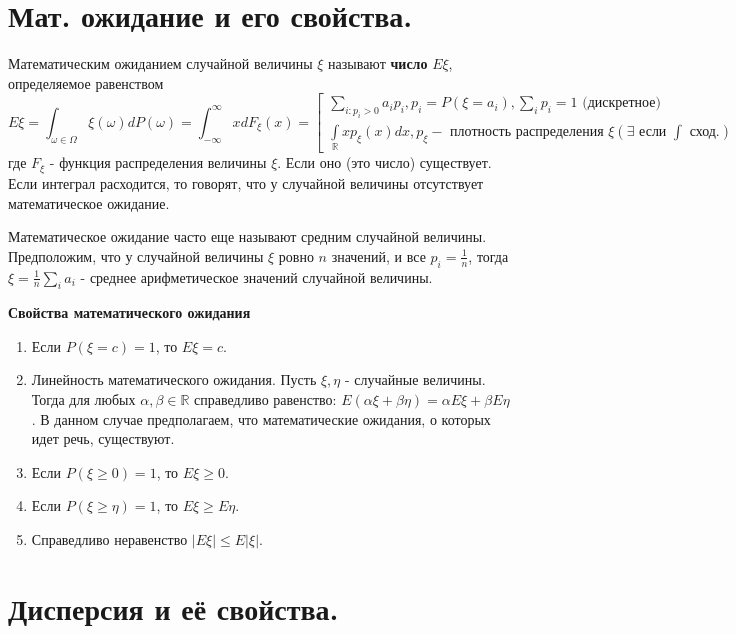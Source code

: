 \section{Мат. ожидание и его свойства.}

Математическим ожиданием случайной величины $\xi$ называют \textbf{число} $E\xi$, определяемое равенством
\[ E\xi = \int_{\omega \in \Omega} \xi (\omega) d P(\omega) = \int_{-\infty}^{\infty} x dF_{\xi} (x) = 
\left[
\begin{array}{c}
	\sum\limits_{i: p_i > 0} a_i p_i, p_i = P(\xi = a_i), \sum_{i} p_i = 1 \text{ (дискретное)} \\
	\int\limits_{\mathbb{R}} x p_{\xi} (x) dx, p_{\xi} - \text{ плотность распределения } \xi (\exists \text{ если } \int \text{ сход.})
\end{array}
\right.
\]
где $F_{\xi}$ - функция распределения величины $\xi$.
Если оно (это число) существует. Если интеграл расходится, то говорят, что у случайной величины отсутствует математическое ожидание.

\begin{remark}
	Математическое ожидание часто еще называют средним случайной величины. Предположим, что у случайной величины $\xi$ ровно $n$ значений, и все $p_i = \frac{1}{n}$, тогда $\xi = \frac{1}{n} \sum\limits_{i} a_i$ - среднее арифметическое значений случайной величины.
\end{remark}

\noindent \textbf{Свойства математического ожидания}
	
\begin{enumerate}
	\item Если $P(\xi = c) = 1$, то $E\xi = c$.
	\item Линейность математического ожидания. Пусть $\xi, \eta$ - случайные величины. Тогда для любых $\alpha, \beta \in \mathbb{R}$ справедливо равенство: $E(\alpha \xi + \beta \eta) = \alpha E \xi + \beta E \eta$. В данном случае предполагаем, что математические ожидания, о которых идет речь, существуют.
	\item Если $P(\xi \ge 0) = 1$, то $E\xi \ge 0$.
	\item Если $P(\xi \ge \eta) = 1$, то $E\xi \ge E\eta$.
	\item Справедливо неравенство $|E\xi| \le E |\xi|$.
\end{enumerate}

\section{Дисперсия и её свойства.}

